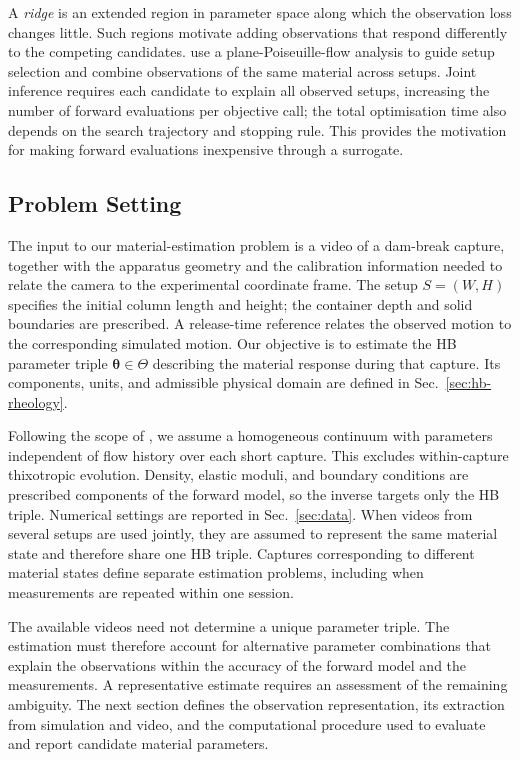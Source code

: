 A \emph{ridge} is an extended region in parameter space along which
the observation loss changes little. Such regions motivate adding
observations that respond differently to the competing candidates.
\citet{hamamichi2023nonnewtonian} use a plane-Poiseuille-flow analysis
to guide setup selection and combine observations of the same material
across setups. Joint inference requires each candidate to explain all
observed setups, increasing the number of forward evaluations per
objective call; the total optimisation time also depends on the search
trajectory and stopping rule. This provides the motivation for making
forward evaluations inexpensive through a surrogate.


\subsection{Problem Setting}
\label{sec:problem}
\label{sec:problem-setting}

The input to our material-estimation problem is a video of a dam-break
capture, together with the apparatus geometry and the calibration
information needed to relate the camera to the experimental coordinate
frame. The setup $S=(W,H)$ specifies the initial column length and
height; the container depth and solid boundaries are prescribed.
A release-time reference relates the observed motion to the
corresponding simulated motion. Our objective is to estimate the HB
parameter triple $\boldsymbol{\theta}\in\Theta$ describing the material
response during that capture. Its components, units, and admissible
physical domain are defined in Sec.~\ref{sec:hb-rheology}.

Following the scope of \citet{hamamichi2023nonnewtonian}, we assume a
homogeneous continuum with parameters independent of flow history over
each short capture. This excludes within-capture thixotropic evolution.
Density, elastic moduli, and boundary conditions are prescribed
components of the forward model, so the inverse targets only the HB
triple. Numerical settings are reported in Sec.~\ref{sec:data}.
When videos from several setups are used jointly, they are assumed to
represent the same material state and therefore share one HB triple.
Captures corresponding to different material states define separate
estimation problems, including when measurements are repeated within
one session.

The available videos need not determine a unique parameter triple.
The estimation must therefore account for alternative parameter
combinations that explain the observations within the accuracy of the
forward model and the measurements. A representative estimate requires
an assessment of the remaining ambiguity. The next section defines the
observation representation, its extraction from simulation and video,
and the computational procedure used to evaluate and report candidate
material parameters.

